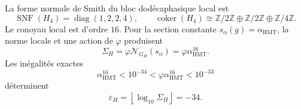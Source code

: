 La forme normale de Smith du bloc dodécaphasique local est
\begin{equation}
 \operatorname{SNF}(H_4)=\operatorname{diag}(1,2,2,4),
 \qquad
 \operatorname{coker}(H_4)
 \cong\mathbb Z/2\mathbb Z\oplus\mathbb Z/2\mathbb Z
 \oplus\mathbb Z/4\mathbb Z.
 \label{eq:l9s102:snf-h4}
\end{equation}
Le conoyau local est d'ordre \(16\). Pour la section constante
\(s_\alpha(g)=\alpha_{\mathrm{HMT}}\), la norme locale et une action de
\(\varphi\) produisent
\begin{equation}
 \boxed{
 \Sigma_H=\varphi\mathcal N_{G_H}(s_\alpha)
 =\varphi\alpha_{\mathrm{HMT}}^{16}.}
 \label{eq:l9s102:sigma-h}
\end{equation}
Les inégalités exactes
\begin{equation}
 \alpha_{\mathrm{HMT}}^{16}<10^{-34}
 <\varphi\alpha_{\mathrm{HMT}}^{16}<10^{-33}
 \label{eq:l9s102:orden-34}
\end{equation}
déterminent
\begin{equation}
 \boxed{
 \varepsilon_H=\left\lfloor\log_{10}\Sigma_H\right\rfloor=-34.}
 \label{eq:l9s102:epsilon-h}
\end{equation}
